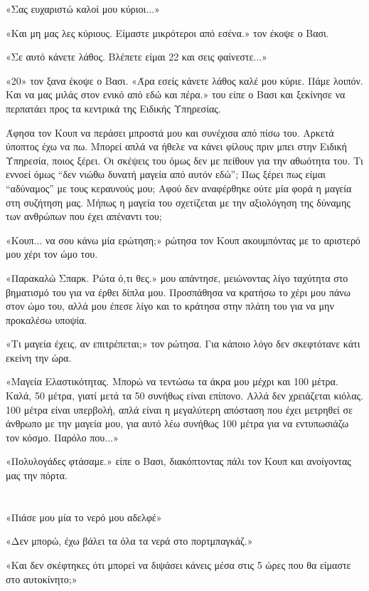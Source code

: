 \documentclass[12pt,twoside, openany]{book}
\begin{document}
«Σας ευχαριστώ καλοί μου κύριοι...»

«Και μη μας λες κύριους. Είμαστε μικρότεροι από εσένα.» τον έκοψε ο Βασι.

«Σε αυτό κάνετε λάθος. Βλέπετε είμαι 22 και σεις φαίνεστε...»

«20» τον ξανα έκοψε ο Βασι. «Άρα εσείς κάνετε λάθος καλέ μου κύριε. Πάμε λοιπόν. Και να μας μιλάς στον ενικό από εδώ και πέρα.» του είπε ο Βασι και ξεκίνησε να περπατάει προς τα κεντρικά της Ειδικής Υπηρεσίας.

Άφησα τον Κουπ να περάσει μπροστά μου και συνέχισα από πίσω του. Αρκετά ύποπτος έχω να πω. Μπορεί απλά να ήθελε να κάνει φίλους πριν μπει στην Ειδική Υπηρεσία, ποιος ξέρει. Οι σκέψεις του όμως δεν με πείθουν για την αθωότητα του. Τι εννοεί όμως “δεν νιώθω δυνατή μαγεία από αυτόν εδώ”; Πως ξέρει πως είμαι “αδύναμος” με τους κεραυνούς μου; Αφού δεν αναφέρθηκε ούτε μία φορά η μαγεία στη συζήτηση μας. Μήπως η μαγεία του σχετίζεται με την αξιολόγηση της δύναμης των ανθρώπων που έχει απέναντι του;

«Κουπ... να σου κάνω μία ερώτηση;» ρώτησα τον Κουπ ακουμπόντας με το αριστερό μου χέρι τον ώμο του.

«Παρακαλώ Σπαρκ. Ρώτα ό,τι θες.» μου απάντησε, μειώνοντας λίγο ταχύτητα στο βηματισμό του για να έρθει δίπλα μου. Προσπάθησα να κρατήσω το χέρι μου πάνω στον ώμο του, αλλά μου έπεσε λίγο και το κράτησα στην πλάτη του για να μην προκαλέσω υποψία.

«Τι μαγεία έχεις, αν επιτρέπεται;» τον ρώτησα. Για κάποιο λόγο δεν σκεφτότανε κάτι εκείνη την ώρα.

«Μαγεία Ελαστικότητας. Μπορώ να τεντώσω τα άκρα μου μέχρι και 100 μέτρα. Καλά, 50 μέτρα, γιατί μετά τα 50 συνήθως είναι επίπονο. Αλλά δεν χρειάζεται κιόλας. 100 μέτρα είναι υπερβολή, απλά είναι η μεγαλύτερη απόσταση που έχει μετρηθεί σε άνθρωπο με την μαγεία μου, για αυτό λέω συνήθως 100 μέτρα για να εντυπωσιάζω τον κόσμο. Παρόλο που...»

«Πολυλογάδες φτάσαμε.» είπε ο Βασι, διακόπτοντας πάλι τον Κουπ και ανοίγοντας μας την πόρτα.

\chapter{}

«Πιάσε μου μία το νερό μου αδελφέ»

«Δεν μπορώ, έχω βάλει τα όλα τα νερά στο πορτμπαγκάζ.»

«Και δεν σκέφτηκες ότι μπορεί να διψάσει κάνεις μέσα στις 5 ώρες που θα είμαστε στο αυτοκίνητο;»
\end{document}
